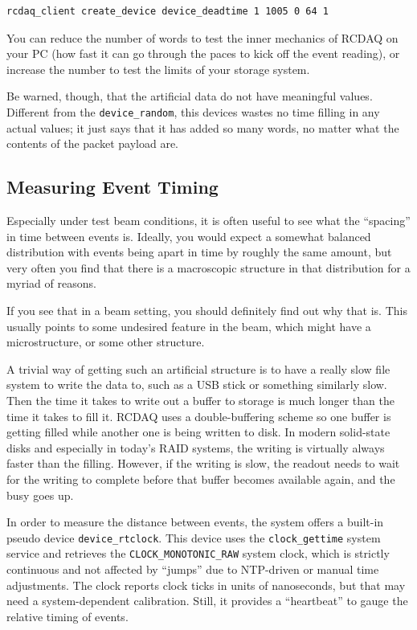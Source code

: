 \documentclass{article}[11pt]
\begin{document}
\begin{verbatim}
rcdaq_client create_device device_deadtime 1 1005 0 64 1
\end{verbatim}

You can reduce the number of words to test the inner mechanics of
RCDAQ on your PC (how fast it can go through the paces to kick off the
event reading), or increase the number to test the limits of your
storage system. 

Be warned, though, that the artificial data do not have meaningful
values. Different from the \verb|device_random|, this devices wastes
no time filling in any actual values; it just says that it has added
so many words, no matter what the contents of the packet payload are.

\subsection{Measuring Event Timing}
\label{eventtiming}

Especially under test beam conditions, it is often useful to see what
the ``spacing'' in time between events is. Ideally, you would expect a
somewhat balanced distribution with events being apart in time by
roughly the same amount, but very often you find that there is a
macroscopic structure in that distribution for a myriad of reasons.

If you see that in a beam setting, you should definitely find out why
that is. This usually points to some undesired feature in the beam,
which might have a microstructure, or some other structure. 

A trivial way of getting such an artificial structure is to have a
really slow file system to write the data to, such as a USB stick or
something similarly slow. Then the time it takes to write out a buffer to
storage is much longer than the time it takes to fill it. RCDAQ uses a
double-buffering scheme so one buffer is getting filled while 
another one is being written to disk. In modern solid-state disks and
especially in today's RAID systems, the writing is virtually always
faster than the filling. However, if the writing is slow, the readout
needs to wait for the writing to complete before that buffer becomes
available again, and the busy goes up.

In order to measure the distance between events, the system offers a
built-in pseudo device \verb|device_rtclock|. This device uses the
\verb|clock_gettime| system service and retrieves the
\verb|CLOCK_MONOTONIC_RAW| system clock, which is strictly continuous
and not affected by ``jumps'' due to NTP-driven or manual time
adjustments. The clock reports clock ticks in units of nanoseconds,
but that may need a system-dependent calibration. Still, it provides a
``heartbeat'' to gauge the relative timing of events. 
\end{document}
